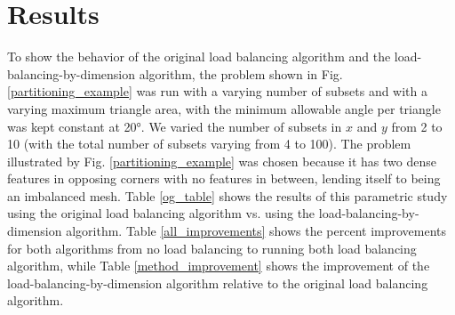 \section{Results}

To show the behavior of the original load balancing algorithm and the load-balancing-by-dimension algorithm, the problem shown in Fig. \ref{partitioning_example} was run with a varying number of subsets and with a varying maximum triangle area, with the minimum allowable angle per triangle was kept constant at \ang{20}. We varied the number of subsets in $x$ and $y$ from 2 to 10 (with the total number of subsets varying from 4 to 100). The problem illustrated by Fig. \ref{partitioning_example} was chosen because it has two dense features in opposing corners with no features in between, lending itself to being an imbalanced mesh. Table \ref{og_table} shows the results of this parametric study using the original load balancing algorithm vs. using the load-balancing-by-dimension algorithm. Table \ref{all_improvements} shows the percent improvements for both algorithms from no load balancing to running both load balancing algorithm, while Table \ref{method_improvement} shows the improvement of the load-balancing-by-dimension algorithm relative to the original load balancing algorithm.

